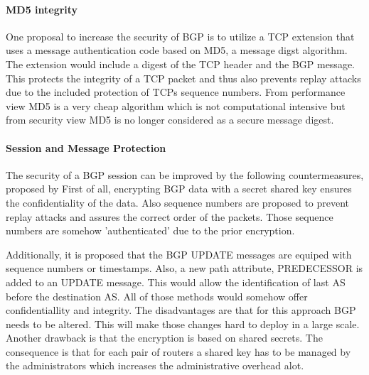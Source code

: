 \documentclass[12pt,a4paper]{IEEEtran}
\begin{document}
		\paragraph{MD5 integrity} One proposal to increase the security of BGP is to utilize a TCP extension that uses a message authentication code based on MD5, a message digst algorithm. The extension would include a digest of the TCP header and the BGP message.  This protects the integrity of a TCP packet and thus also prevents replay attacks due to the included protection of TCPs sequence numbers. 
		From performance view MD5 is a very cheap algorithm which is  not computational intensive but from security view MD5 is no longer considered as a secure message digest. %

		\paragraph{Session and Message Protection}
		The security of a BGP session can be improved by the following countermeasures, proposed by %
		First of all, encrypting BGP data with a secret shared key ensures the confidentiality of the data. 
		Also sequence numbers are proposed to prevent replay attacks and assures the correct order of the packets. Those sequence numbers are somehow 'authenticated' due to the prior encryption. 

		Additionally, it is proposed that the BGP UPDATE messages are equiped with sequence numbers or timestamps.
		Also, a new path attribute, PREDECESSOR is added to an UPDATE message. This would allow the identification of last AS before the destination AS. All of those methods would somehow offer confidentiallity and integrity. The disadvantages are that for this approach BGP needs to be altered. This will make those changes hard to deploy in a large scale. Another drawback is that the encryption is based on shared secrets. The consequence is that for each pair of routers a shared key has to be managed by the administrators which increases the administrative overhead alot.
					       
\end{document}
